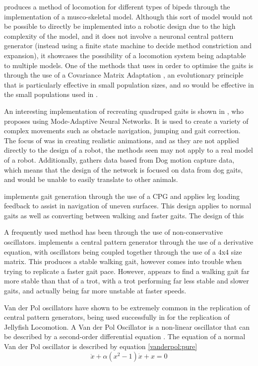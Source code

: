\cite{Geijtenbeek2013} produces a method of locomotion for different types of bipeds through the implementation of a musco-skeletal model. Although this sort of model would not be possible to directly be implemented into a robotic design due to the high complexity of the model, and it does not involve a neuronal central pattern generator (instead using a finite state machine to decide method constriction and expansion), it showcases the possibility of a locomotion system being adaptable to multiple models. One of the methods that \cite{Geijtenbeek2013} uses in order to optimise the gaits is through the use of a Covariance Matrix Adaptation \cite{Hansen2016}, an evolutionary principle that is particularly effective in small population sizes, and so would be effective in the small populations used in \cite{Geijtenbeek2013}. 

An interesting implementation of recreating quadruped gaits is shown in \cite{Zhang2018}, who proposes using Mode-Adaptive Neural Networks. It is used to create a variety of complex movements such as obstacle navigation, jumping and gait correction. The focus of \cite{Zhang2018} was in creating realistic animations, and as they are not applied directly to the design of a robot, the methods seen may not apply to a real model of a robot. Additionally, \cite{Zhang2018} gathers data based from Dog motion capture data, which means that the design of the network is focused on data from dog gaits, and would be unable to easily translate to other animals. 

\cite{Fukuoka2015} implements gait generation  through the use of a CPG and applies leg loading feedback to assist in navigation of uneven surfaces. This design applies to normal gaits as well as converting between walking and faster gaits. The design of this 

A frequently used method has been through the use of non-conservative oscillators. \cite{Rutishauser2008} implements a central pattern generator through the use of a derivative equation, with oscillators being coupled together through the use of a 4x4 size matrix. This produces a stable walking gait, however comes into trouble when trying to replicate a faster gait pace. However, \cite{Rutishauser2008} appears to find a walking gait far more stable than that of a trot, with a trot performing far less stable and slower gaits, and actually being far more unstable at faster speeds. 

Van der Pol oscillators have shown to be extremely common in the replication of central pattern generators, being used successfully in \cite{Low2006} for the replication of Jellyfish Locomotion. A Van der Pol Oscillator is a non-linear oscillator that can be described by a second-order differential equation \citep{Barbosa2007}. The equation of a normal Van der Pol oscillator is described by equation \ref{vanderpol:pure}
\begin{equation}
\ddot{x} + \alpha(x^2 - 1)\dot{x} + x = 0
\label{vanderpol:pure}
\end{equation}

